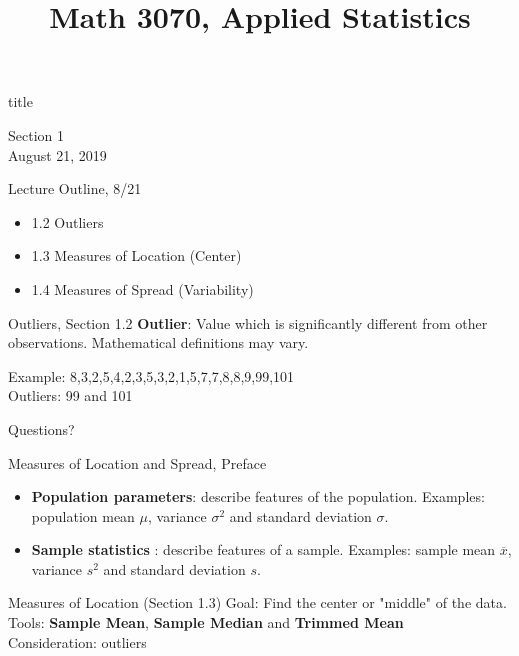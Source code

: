 \documentclass{beamer}
\title{Math 3070, Applied Statistics}
\newcommand{\qtns}[0]{\begin{center} Questions? \end{center}}
\newcommand{\nl}[1]{\vspace{#1 em}}
\newcommand{\defn}[1]{{\bf #1}}
\begin{document}
\begin{frame}
    \begin{beamercolorbox}[rounded=true,wd=\textwidth,center]{title}
        \inserttitle
    \end{beamercolorbox}
    \begin{center}
        Section 1\\
        \nl{0.5}
        August 21, 2019
    \end{center}

\end{frame}

\begin{frame}{Lecture Outline, 8/21}
    \begin{itemize}
        \item 1.2 Outliers
        \item 1.3 Measures of Location (Center)
        \item 1.4 Measures of Spread (Variability)
    \end{itemize}
\end{frame}

\begin{frame}{Outliers, Section 1.2}
    \defn{Outlier}: Value which is significantly different from other observations. Mathematical definitions may vary.
    \begin{center}
        Example: 8,3,2,5,4,2,3,5,3,2,1,5,7,7,8,8,9,99,101\\
        \nl{0.5}
        Outliers: 99 and 101
    \end{center}
    \qtns
\end{frame}

\begin{frame}{Measures of Location and Spread, Preface}
    \begin{itemize}
        \item {\bf Population parameters}: describe features of the population. Examples: population mean $\mu$, variance $\sigma^2$ and standard deviation $\sigma$.
        \item {\bf Sample statistics }: describe features of a sample. Examples: sample mean $\overline{x}$, variance $s^2$ and standard deviation $s$.
    \end{itemize}
\end{frame}

\begin{frame}{Measures of Location (Section 1.3)}
    Goal: Find the center or "middle" of the data.
    \nl{1}\\
    Tools: \defn{Sample Mean}, \defn{Sample Median} and \defn{Trimmed Mean}
    \nl{1}\\
    Consideration: outliers
\end{frame}
\end{document}
